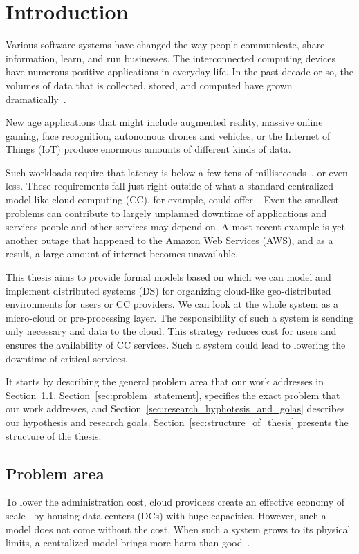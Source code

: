 \pagestyle{fancy}
\fancyhf{}
\fancyhead[RE,LO]{\leftmark}
\fancyfoot[CE,CO]{\thepage}
\chapter{Introduction}\label{chapter:Intro}
%
Various software systems have changed the way people communicate, share information, learn, and run businesses. The interconnected computing devices have numerous positive applications in everyday life. In the past decade or so, the volumes of data that is collected, stored, and computed have grown dramatically~\cite{ChiangZ16}. 

New age applications that might include augmented reality, massive online gaming, face recognition, autonomous drones and vehicles, or the Internet of Things (IoT) produce enormous amounts of different kinds of data. 

Such workloads require that latency is below a few tens of milliseconds~\cite{ChiangZ16}, or even less. These requirements fall just right outside of what a standard centralized model like cloud computing (CC), for example, could offer~\cite{ChiangZ16}. Even the smallest problems can contribute to largely unplanned downtime of applications and services people and other services may depend on. A most recent example is yet another outage that happened to the Amazon Web Services (AWS), and as a result, a large amount of internet becomes unavailable.

This thesis aims to provide formal models based on which we can model and implement distributed systems (DS) for organizing cloud-like geo-distributed environments for users or CC providers. We can look at the whole system as a micro-cloud or pre-processing layer. The responsibility of such a system is sending only necessary and data to the cloud. This strategy reduces cost for users and ensures the availability of CC services. Such a system could lead to lowering the downtime of critical services.

It starts by describing the general problem area that our work addresses in Section~\ref{sec:problem_area}. Section~\ref{sec:problem_statement}, specifies the exact problem that our work addresses, and Section~\ref{sec:research_hyphotesis_and_golas} describes our hypothesis and research goals. Section~\ref{sec:structure_of_thesis} presents the structure of the thesis.
%
%
%
\section{Problem area}\label{sec:problem_area}
%
To lower the administration cost, cloud providers create an effective economy of scale~\cite{BariBEGPRZZ13} by housing data-centers (DCs) with huge capacities. However, such a model does not come without the cost. When such a  system grows to its physical limits, a centralized model brings more harm than good~\cite{GunawiHSLSAE16, LopezMEDHIBFR15}. 

